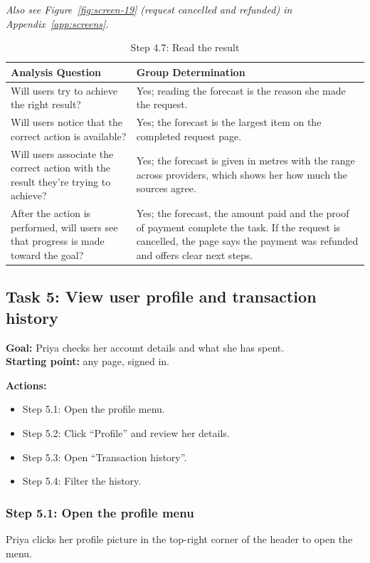 \documentclass{article}
\begin{document}
\textit{Also see Figure~\ref{fig:screen-19} (request cancelled and refunded) in Appendix~\ref{app:screens}.}

\begin{table}[H]
    \centering
    \begin{tabularx}{\textwidth}{|p{5.5cm}|X|}
        \hline
        \textbf{Analysis Question} & \textbf{Group Determination} \\
        \hline
        Will users try to achieve the right result? & Yes; reading the forecast is the reason she made the request. \\
        \hline
        Will users notice that the correct action is available? & Yes; the forecast is the largest item on the completed request page. \\
        \hline
        Will users associate the correct action with the result they're trying to achieve? & Yes; the forecast is given in metres with the range across providers, which shows her how much the sources agree. \\
        \hline
        After the action is performed, will users see that progress is made toward the goal? & Yes; the forecast, the amount paid and the proof of payment complete the task. If the request is cancelled, the page says the payment was refunded and offers clear next steps. \\
        \hline
    \end{tabularx}
    \caption{Step 4.7: Read the result}
    \label{tab:cw-step-4-7}
\end{table}

\subsection{Task 5: View user profile and transaction history}
\textbf{Goal:} Priya checks her account details and what she has spent.\\
\textbf{Starting point:} any page, signed in.

\textbf{Actions:}
\begin{itemize}
    \item Step 5.1: Open the profile menu.
    \item Step 5.2: Click ``Profile'' and review her details.
    \item Step 5.3: Open ``Transaction history''.
    \item Step 5.4: Filter the history.
\end{itemize}

\subsubsection{Step 5.1: Open the profile menu}
Priya clicks her profile picture in the top-right corner of the header to open the menu.
\end{document}
